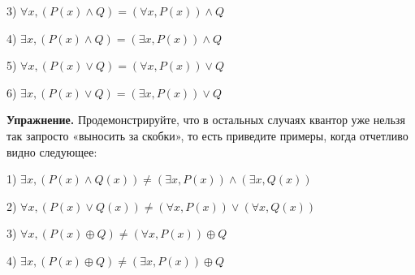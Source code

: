 3) $\forall x, (P(x) \wedge Q) = (\forall x, P(x))\wedge Q$

4) $\exists x, (P(x) \wedge Q) = (\exists x, P(x))\wedge Q$

5) $\forall x, (P(x) \vee Q) = (\forall x, P(x))\vee Q$

6) $\exists x, (P(x) \vee Q) = (\exists x, P(x))\vee Q$

{\bfseries Упражнение.} Продемонстрируйте, что в остальных случаях квантор уже нельзя так запросто «выносить за скобки», то есть приведите примеры, когда отчетливо видно следующее:

1) $\exists x,(P(x)\wedge Q(x))\not=(\exists x, P(x))\wedge (\exists x,Q(x))$

2) $\forall x, (P(x) \vee Q(x)) \not= (\forall x, P(x))\vee (\forall x, Q(x))$

3) $\forall x, (P(x) \oplus Q) \not= (\forall x, P(x))\oplus Q$

4) $\exists x, (P(x) \oplus Q) \not= (\exists x, P(x))\oplus Q$
